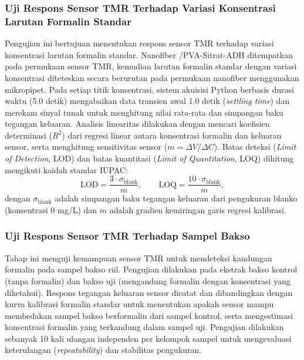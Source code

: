 \subsubsection{Uji Respons Sensor TMR Terhadap Variasi Konsentrasi Larutan Formalin Standar}
Pengujian ini bertujuan menentukan respons sensor TMR terhadap variasi konsentrasi larutan formalin standar. Nanofiber /PVA-Sitrat-ADH ditempatkan pada permukaan sensor TMR, kemudian larutan formalin standar dengan variasi konsentrasi diteteskan secara berurutan pada permukaan nanofiber menggunakan mikropipet. Pada setiap titik konsentrasi, sistem akuisisi Python berbasis durasi waktu (5.0 detik) mengabaikan data transien awal 1.0 detik (\textit{settling time}) dan merekam sinyal tunak untuk menghitung nilai rata-rata dan simpangan baku tegangan keluaran. Analisis linearitas dilakukan dengan mencari koefisien determinasi ($R^2$) dari regresi linear antara konsentrasi formalin dan keluaran sensor, serta menghitung sensitivitas sensor ($m = \Delta V / \Delta C$). Batas deteksi (\textit{Limit of Detection}, LOD) dan batas kuantitasi (\textit{Limit of Quantitation}, LOQ) dihitung mengikuti kaidah standar IUPAC:
\begin{equation}
\mathrm{LOD} = \frac{3 \cdot \sigma_{\text{blank}}}{m}, \qquad \mathrm{LOQ} = \frac{10 \cdot \sigma_{\text{blank}}}{m},
\end{equation}
dengan $\sigma_{\text{blank}}$ adalah simpangan baku tegangan keluaran dari pengukuran blanko (konsentrasi 0 mg/L) dan $m$ adalah gradien kemiringan garis regresi kalibrasi.

\subsubsection{Uji Respons Sensor TMR Terhadap Sampel Bakso}
Tahap ini menguji kemampuan sensor TMR untuk mendeteksi kandungan formalin pada sampel bakso riil. Pengujian dilakukan pada ekstrak bakso kontrol (tanpa formalin) dan bakso uji (mengandung formalin dengan konsentrasi yang diketahui). Respons tegangan keluaran sensor dicatat dan dibandingkan dengan kurva kalibrasi formalin standar untuk menentukan apakah sensor mampu membedakan sampel bakso berformalin dari sampel kontrol, serta mengestimasi konsentrasi formalin yang terkandung dalam sampel uji. Pengujian dilakukan sebanyak 10 kali ulangan independen per kelompok sampel untuk mengevaluasi keterulangan (\textit{repeatability}) dan stabilitas pengukuran.

